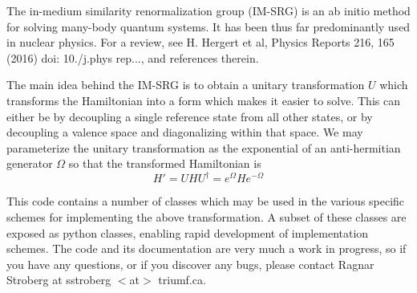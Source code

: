 The in-\/medium similarity renormalization group (I\+M-\/\+S\+RG) is an ab initio method for solving many-\/body quantum systems. It has been thus far predominantly used in nuclear physics. For a review, see H. Hergert et al, Physics Reports 216, 165 (2016) doi\+: 10./j.phys rep..., and references therein.

The main idea behind the I\+M-\/\+S\+RG is to obtain a unitary transformation $ U $ which transforms the Hamiltonian into a form which makes it easier to solve. This can either be by decoupling a single reference state from all other states, or by decoupling a valence space and diagonalizing within that space. We may parameterize the unitary transformation as the exponential of an anti-\/hermitian generator $ \Omega $ so that the transformed Hamiltonian is \[ H' = UHU^{\dagger} = e^{\Omega}He^{-\Omega} \]

This code contains a number of classes which may be used in the various specific schemes for implementing the above transformation. A subset of these classes are exposed as python classes, enabling rapid development of implementation schemes. The code and its documentation are very much a work in progress, so if you have any questions, or if you discover any bugs, please contact Ragnar Stroberg at sstroberg $<$at$>$ triumf.\+ca. 
